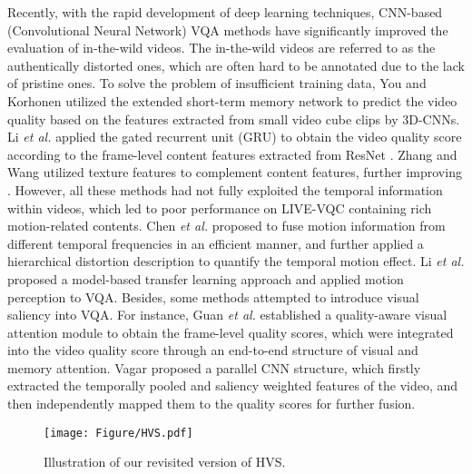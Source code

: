\documentclass[journal]{IEEEtran}
\begin{document}
Recently, with the rapid development of deep learning techniques, CNN-based (Convolutional Neural Network)
VQA methods have significantly improved the evaluation of in-the-wild videos.
The in-the-wild videos are referred to as the authentically distorted ones, which are often hard to be annotated due to the lack of pristine ones.
To solve the problem of insufficient training data,
You and Korhonen \cite{You2019} utilized the extended short-term memory network to predict the video quality based on the features extracted from small video cube clips by 3D-CNNs. Li \emph{et al.} \cite{VSFA} applied the gated recurrent unit (GRU) \cite{GRU} to obtain the video quality score according to the frame-level content features extracted from ResNet \cite{ResNet}. Zhang and Wang \cite{TiVQA} utilized texture features to complement content features, further improving \cite{VSFA}.
However, all these methods had not fully exploited the temporal information within videos, which led to poor performance on LIVE-VQC containing rich motion-related contents.
Chen \emph{et al.} \cite{RIRNet} proposed to fuse motion information from different temporal frequencies in an efficient manner, and further applied a hierarchical distortion description to quantify the temporal motion effect.
Li \emph{et al.} \cite{Li2022} proposed a model-based transfer learning approach and applied motion perception to VQA.
Besides, some methods attempted to introduce visual saliency into VQA. For instance, Guan \emph{et al.} \cite{Guan2022} established a quality-aware visual attention module to obtain the frame-level quality scores, which were integrated into the video quality score through an end-to-end structure of visual and memory attention.
Vagar \cite{Vagar2022} proposed a parallel CNN structure, which firstly extracted the temporally pooled and saliency weighted features of the video, and then independently mapped them to the quality scores for further fusion.

\begin{figure}[t]\centering
\setlength{\belowcaptionskip}{-0.18cm}
{\texttt{[image: Figure/HVS.pdf]}}


\caption{Illustration of our revisited version of HVS.}
\label{fig:HVS}
\end{figure}
\end{document}

